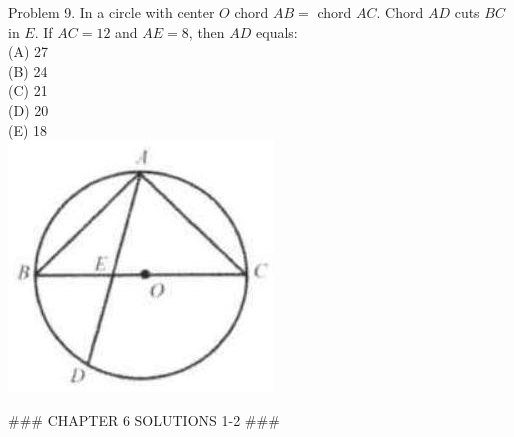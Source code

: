 \documentclass[10pt]{article}
\begin{document}
Problem 9. In a circle with center \(O\) chord \(A B=\) chord \(A C\). Chord \(A D\) cuts \(B C\) in \(E\). If \(A C=12\) and \(A E=8\), then \(A D\) equals:\\
(A) 27\\
(B) 24\\
(C) 21\\
(D) 20\\
(E) 18\\
\includegraphics[max width=\textwidth, center]{2025_04_17_97bc1f7e44d93c271a88g-170}


### CHAPTER 6 SOLUTIONS 1-2 ###
\end{document}
